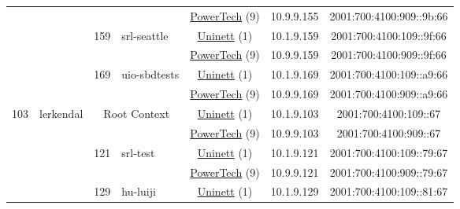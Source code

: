 \begin{small}
\begin{center}
\begin{longtable}{|c|c|c|c|c|c|c|c|}
  &  &  &  & \multicolumn{2}{|c|}{\tiny{\href{http://www.powertech.no}{PowerTech} (9)}} & \tiny{10.9.9.155} & \tiny{2001:700:4100:909::9b:66} \\* \cline{3-3}\cline{4-4}\cline{5-5}\cline{6-6}\cline{7-7}\cline{8-8}
  &  & \multirow{2}{*}{\tiny{159}} & \multicolumn{1}{|l|}{\multirow{2}{*}{\tiny{srl-seattle}}} & \multicolumn{2}{|c|}{\tiny{\href{https://www.uninett.no}{Uninett} (1)}} & \tiny{10.1.9.159} & \tiny{2001:700:4100:109::9f:66} \\* \cline{5-5}\cline{6-6}\cline{7-7}\cline{8-8}
  &  &  &  & \multicolumn{2}{|c|}{\tiny{\href{http://www.powertech.no}{PowerTech} (9)}} & \tiny{10.9.9.159} & \tiny{2001:700:4100:909::9f:66} \\* \cline{3-3}\cline{4-4}\cline{5-5}\cline{6-6}\cline{7-7}\cline{8-8}
  &  & \multirow{2}{*}{\tiny{169}} & \multicolumn{1}{|l|}{\multirow{2}{*}{\tiny{uio-sbdtests}}} & \multicolumn{2}{|c|}{\tiny{\href{https://www.uninett.no}{Uninett} (1)}} & \tiny{10.1.9.169} & \tiny{2001:700:4100:109::a9:66} \\* \cline{5-5}\cline{6-6}\cline{7-7}\cline{8-8}
  &  &  &  & \multicolumn{2}{|c|}{\tiny{\href{http://www.powertech.no}{PowerTech} (9)}} & \tiny{10.9.9.169} & \tiny{2001:700:4100:909::a9:66} \\ \hline
 \multirow{18}{*}{\tiny{103}} & \multicolumn{1}{|l|}{\multirow{18}{*}{\tiny{lerkendal}}} & \multicolumn{2}{|c|}{\multirow{2}{*}{\tiny{Root Context}}} & \multicolumn{2}{|c|}{\tiny{\href{https://www.uninett.no}{Uninett} (1)}} & \tiny{10.1.9.103} & \tiny{2001:700:4100:109::67} \\* \cline{5-5}\cline{6-6}\cline{7-7}\cline{8-8}
  &  & \multicolumn{2}{|c|}{} & \multicolumn{2}{|c|}{\tiny{\href{http://www.powertech.no}{PowerTech} (9)}} & \tiny{10.9.9.103} & \tiny{2001:700:4100:909::67} \\* \cline{3-3}\cline{4-4}\cline{5-5}\cline{6-6}\cline{7-7}\cline{8-8}
  &  & \multirow{2}{*}{\tiny{121}} & \multicolumn{1}{|l|}{\multirow{2}{*}{\tiny{srl-test}}} & \multicolumn{2}{|c|}{\tiny{\href{https://www.uninett.no}{Uninett} (1)}} & \tiny{10.1.9.121} & \tiny{2001:700:4100:109::79:67} \\* \cline{5-5}\cline{6-6}\cline{7-7}\cline{8-8}
  &  &  &  & \multicolumn{2}{|c|}{\tiny{\href{http://www.powertech.no}{PowerTech} (9)}} & \tiny{10.9.9.121} & \tiny{2001:700:4100:909::79:67} \\* \cline{3-3}\cline{4-4}\cline{5-5}\cline{6-6}\cline{7-7}\cline{8-8}
  &  & \multirow{2}{*}{\tiny{129}} & \multicolumn{1}{|l|}{\multirow{2}{*}{\tiny{hu-luiji}}} & \multicolumn{2}{|c|}{\tiny{\href{https://www.uninett.no}{Uninett} (1)}} & \tiny{10.1.9.129} & \tiny{2001:700:4100:109::81:67} \\* \cline{5-5}\cline{6-6}\cline{7-7}\cline{8-8}

\end{longtable}
\end{center}
\end{small}
